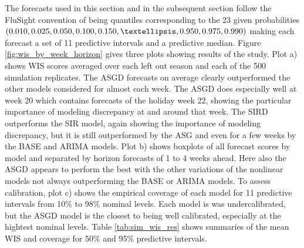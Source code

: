




The forecasts used in this section and in the subsequent section follow the 
FluSight convention of being quantiles corresponding to the 23 given 
probabilities $\\(0.010, 0.025, 0.050, 0.100, 0.150, …, 0.950, 0.975, 0.990)$
making each forecast a set of 11 predictive intervals and a predictive median.
Figure \ref{fig:wis_by_week_horizon} gives three plots showing results of the 
study. Plot a) shows WIS scores averaged over each left out season and each 
of the 500 simulation replicates. The ASGD forecasts on average clearly 
outperformed the other models considered for almost each week. The ASGD does
especially well at week 20 which contains forecasts of the holiday week 22, 
showing the particular importance of modeling discrepancy at and around that 
week. The SIRD outperforms the SIR model, again showing the importance of 
modeling discrepancy, but it is still outperformed by the ASG and even for a
few weeks by the BASE and ARIMA models. Plot b) shows boxplots of all forecast
scores by model and separated by horizon forecasts of 1 to 4 weeks ahead. Here
also the ASGD appears to perform the best with the other variations of the 
nonlinear models not always outperforming the BASE or ARIMA models. 
To assess calibration, plot c)
shows the empirical coverage of each model for 11 predictive intervals from 
10\% to 98\% nominal levels. Each model is was undercalibrated, but the ASGD 
model is the closest to being well calibrated, especially at the hightest 
nominal levels. Table \ref{tab:sim_wis_res} shows summaries of the mean WIS and
coverage for 50\% and 95\% predictive intervals.



